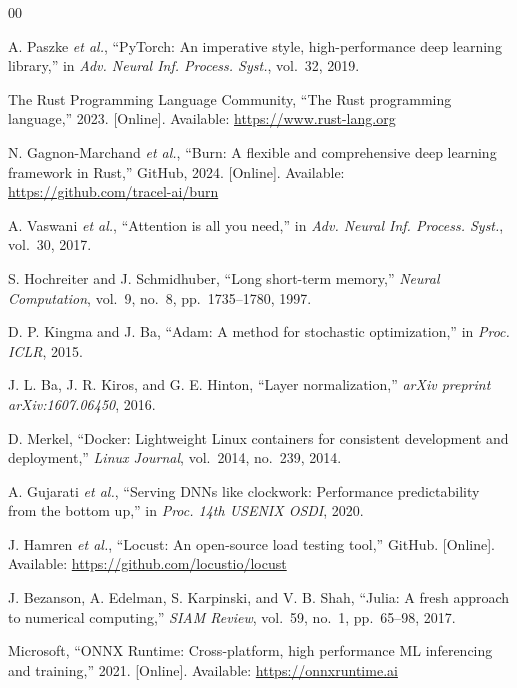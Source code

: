 \documentclass{ieeeaccess}
\begin{document}
\begin{thebibliography}{00}

A. Paszke \textit{et al.}, ``PyTorch: An imperative style, high-performance deep learning library,'' in \textit{Adv. Neural Inf. Process. Syst.}, vol.~32, 2019.

The Rust Programming Language Community, ``The Rust programming language,'' 2023. [Online]. Available: \url{https://www.rust-lang.org}

N. Gagnon-Marchand \textit{et al.}, ``Burn: A flexible and comprehensive deep learning framework in Rust,'' GitHub, 2024. [Online]. Available: \url{https://github.com/tracel-ai/burn}

A. Vaswani \textit{et al.}, ``Attention is all you need,'' in \textit{Adv. Neural Inf. Process. Syst.}, vol.~30, 2017.

S. Hochreiter and J. Schmidhuber, ``Long short-term memory,'' \textit{Neural Computation}, vol.~9, no.~8, pp.~1735--1780, 1997.

D. P. Kingma and J. Ba, ``Adam: A method for stochastic optimization,'' in \textit{Proc. ICLR}, 2015.

J. L. Ba, J. R. Kiros, and G. E. Hinton, ``Layer normalization,'' \textit{arXiv preprint arXiv:1607.06450}, 2016.

D. Merkel, ``Docker: Lightweight Linux containers for consistent development and deployment,'' \textit{Linux Journal}, vol.~2014, no.~239, 2014.

A. Gujarati \textit{et al.}, ``Serving DNNs like clockwork: Performance predictability from the bottom up,'' in \textit{Proc. 14th USENIX OSDI}, 2020.

J. Hamren \textit{et al.}, ``Locust: An open-source load testing tool,'' GitHub. [Online]. Available: \url{https://github.com/locustio/locust}

J. Bezanson, A. Edelman, S. Karpinski, and V. B. Shah, ``Julia: A fresh approach to numerical computing,'' \textit{SIAM Review}, vol.~59, no.~1, pp.~65--98, 2017.

Microsoft, ``ONNX Runtime: Cross-platform, high performance ML inferencing and training,'' 2021. [Online]. Available: \url{https://onnxruntime.ai}


\end{thebibliography}
\end{document}
